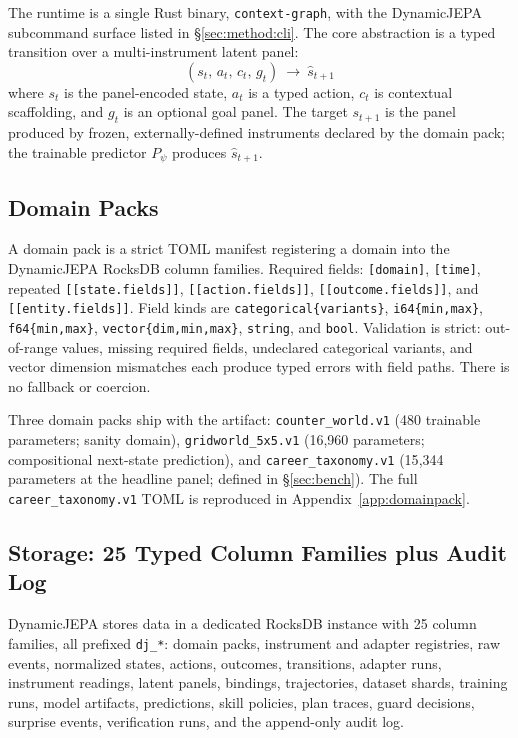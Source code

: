 \documentclass[10pt,twocolumn,letterpaper]{article}
\newcommand{\code}[1]{\texttt{\small #1}}
\begin{document}
The runtime is a single Rust binary, \code{context-graph}, with
the DynamicJEPA subcommand surface listed in
\S\ref{sec:method:cli}. The core abstraction is a typed transition
over a multi-instrument latent panel:
\begin{equation*}
  (s_t,\, a_t,\, c_t,\, g_t)\ \longrightarrow\ \hat{s}_{t+1}
\end{equation*}
where $s_t$ is the panel-encoded state, $a_t$ is a typed action,
$c_t$ is contextual scaffolding, and $g_t$ is an optional goal
panel. The target $s_{t+1}$ is the panel produced by frozen,
externally-defined instruments declared by the domain pack; the
trainable predictor $P_\psi$ produces $\hat{s}_{t+1}$.

\subsection{Domain Packs}

A domain pack is a strict TOML manifest registering a domain into
the DynamicJEPA RocksDB column families. Required fields:
\code{[domain]}, \code{[time]}, repeated \code{[[state.fields]]},
\code{[[action.fields]]}, \code{[[outcome.fields]]}, and
\code{[[entity.fields]]}. Field kinds are
\code{categorical\{variants\}}, \code{i64\{min,max\}},
\code{f64\{min,max\}}, \code{vector\{dim,min,max\}}, \code{string},
and \code{bool}. Validation is strict: out-of-range values, missing
required fields, undeclared categorical variants, and vector
dimension mismatches each produce typed errors with field paths.
There is no fallback or coercion.

Three domain packs ship with the artifact:
\code{counter\_world.v1} (480 trainable parameters; sanity domain),
\code{gridworld\_5x5.v1} (16{,}960 parameters; compositional
next-state prediction), and \code{career\_taxonomy.v1} (15{,}344
parameters at the headline panel; defined in \S\ref{sec:bench}).
The full \code{career\_taxonomy.v1} TOML is reproduced in
Appendix~\ref{app:domainpack}.

\subsection{Storage: 25 Typed Column Families plus Audit Log}

DynamicJEPA stores data in a dedicated RocksDB instance with 25
column families, all prefixed \code{dj\_*}: domain packs,
instrument and adapter registries, raw events, normalized states,
actions, outcomes, transitions, adapter runs, instrument readings,
latent panels, bindings, trajectories, dataset shards, training
runs, model artifacts, predictions, skill policies, plan traces,
guard decisions, surprise events, verification runs, and the
append-only audit log.
\end{document}
